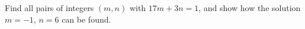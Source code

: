 Find all pairs of integers $(m,n)$ with $17m+3n=1$, and show how the solution $m=-1$, $n=6$ can be found.
